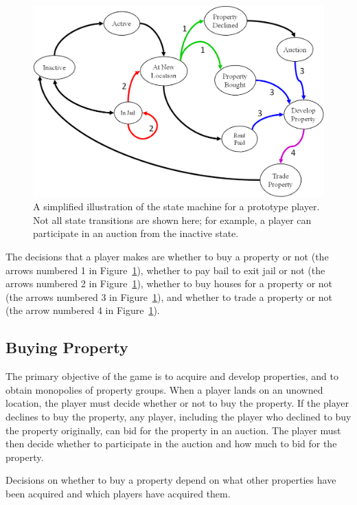 \begin{figure}[htp]
\centerline{\includegraphics[width=1.0\columnwidth]{Figures/statemachine.png}}
\caption[Monopoly player state machine]{A simplified illustration of the state
machine for a prototype player. Not all state transitions are shown here; for
example, a player can participate in an auction from the inactive state.}
\label{figure-statemachine}
\end{figure}

The decisions that a player makes are whether to buy a property or not (the
arrows numbered 1 in Figure~\ref{figure-statemachine}), whether to pay bail to
exit jail or not (the arrows numbered 2 in Figure~\ref{figure-statemachine}),
whether to buy houses for a property or not (the arrows numbered 3 in
Figure~\ref{figure-statemachine}), and whether to trade a property or not (the
arrow numbered 4 in Figure~\ref{figure-statemachine}).

\subsection{Buying Property}
The primary objective of the game is to acquire and develop properties, and to
obtain monopolies of property groups. When a player lands on an unowned
location, the player must decide whether or not to buy the property. If the
player declines to buy the property, any player, including the player who
declined to buy the property originally, can bid for the property in an auction.
The player must then decide whether to participate in the auction and how much
to bid for the property.

Decisions on whether to buy a property depend on what other properties have been
acquired and which players have acquired them.
  
